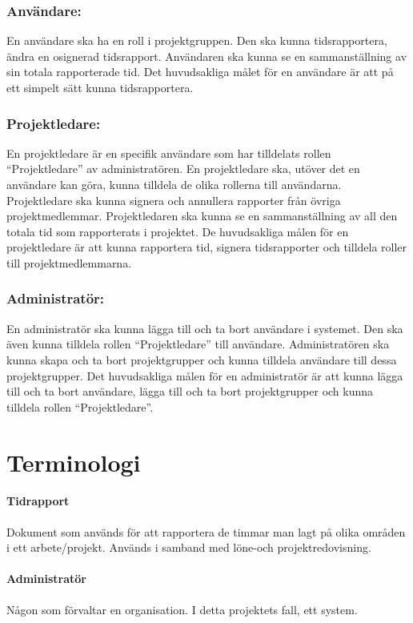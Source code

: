 \documentclass[paper=a4, fontsize=11pt,twoside]{article}
\begin{document}
\subsubsection{Användare:}
En användare ska ha en roll i projektgruppen. Den ska kunna tidsrapportera, ändra en osignerad tidsrapport. Användaren ska kunna se en sammanställning av sin totala rapporterade tid. Det huvudsakliga målet för en användare är att på ett simpelt sätt kunna tidsrapportera.
\subsubsection{Projektledare:}
En projektledare är en specifik användare som har tilldelats rollen “Projektledare” av administratören. En projektledare ska, utöver det en användare kan göra, kunna tilldela de olika rollerna till användarna. Projektledare ska kunna signera och annullera rapporter från övriga projektmedlemmar. Projektledaren ska kunna se en sammanställning av all den totala tid som rapporterats i projektet. De huvudsakliga målen för en projektledare är att kunna rapportera tid, signera tidsrapporter och tilldela roller till projektmedlemmarna. 
\subsubsection{Administratör:}
En administratör ska kunna lägga till och ta bort användare i systemet. Den ska även kunna tilldela rollen “Projektledare” till användare. Administratören ska kunna skapa och ta bort projektgrupper och kunna tilldela användare till dessa projektgrupper. Det huvudsakliga målen för en administratör är att kunna lägga till och ta bort användare, lägga till och ta bort projektgrupper och kunna tilldela rollen “Projektledare”.



\section{Terminologi}
\paragraph{Tidrapport}
\flushleft
Dokument som används för att rapportera de timmar man lagt på olika områden i ett arbete/projekt. Används i samband med löne-och projektredovisning.
\paragraph{Administratör}
\flushleft
Någon som förvaltar en organisation. I detta projektets fall, ett system.
\end{document}
